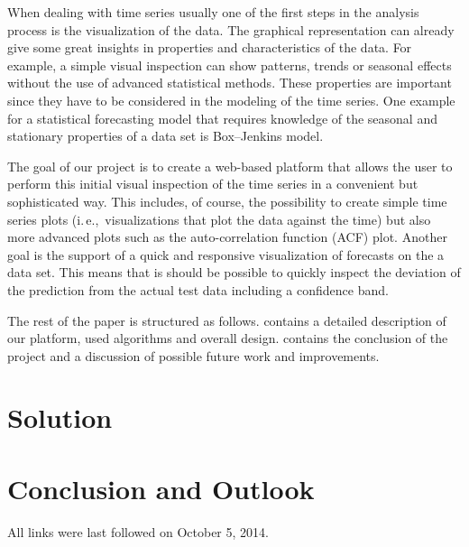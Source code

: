\documentclass[runningheads,a4paper]{llncs}
\newcommand{\ie}{i.\,e.,\ }
\begin{document}
When dealing with time series usually one of the first steps in the analysis process is the visualization of the data.
The graphical representation can already give some great insights in properties and characteristics of the data.
For example, a simple visual inspection can show patterns, trends or seasonal effects without the use of advanced statistical methods. 
These properties are important since they have to be considered in the modeling of the time series.
One example for a statistical forecasting model that requires knowledge of the seasonal and stationary properties of a data set is Box--Jenkins \cite{Box1976} model.

The goal of our project is to create a web-based platform that allows the user to perform this initial visual inspection of the time series in a convenient but sophisticated way.
This includes, of course, the possibility to create simple time series plots (\ie visualizations that plot the data against the time) but also more advanced plots such as the auto-correlation function (ACF) plot.
Another goal is the support of a quick and responsive visualization of forecasts on the a data set. 
This means that is should be possible to quickly inspect the deviation of the prediction from the actual test data including a confidence band.

The rest of the paper is structured as follows. 
 contains a detailed description of our platform, used algorithms and overall design.
 contains the conclusion of the project and a discussion of possible future work and improvements.


\section{Solution}\label{sec:solution}

\section{Conclusion and Outlook}\label{sec:conclusion}





All links were last followed on October 5, 2014. %
\end{document}
